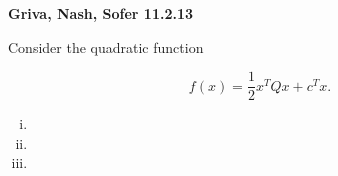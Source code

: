 \textbf{Griva, Nash, Sofer 11.2.13}

Consider the quadratic function

$$
f(x) = \frac{1}{2} x^T Q x + c^T x.
$$

\begin{enumerate}[(i)]
  \item 
  \item 
  \item 
\end{enumerate}

